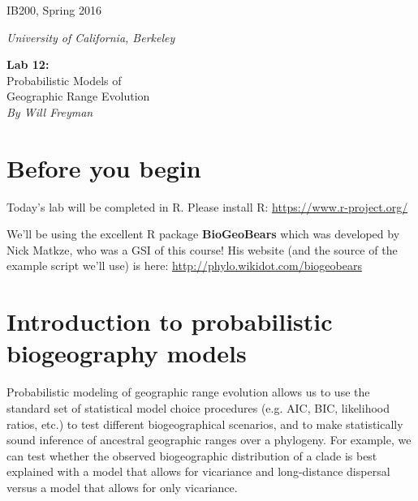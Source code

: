 \documentclass[11pt]{article}
\begin{document}
\noindent
\large
\begin{minipage}{0.5\textwidth}
\begin{flushleft} 
IB200, Spring 2016
\end{flushleft}
\end{minipage}
\begin{minipage}{0.5\textwidth}
\begin{flushright} 
\textit{University of California, Berkeley}
\end{flushright}
\end{minipage}

\vspace{0.5cm}


\begin{center}
\Large \textbf{Lab 12:} \\
Probabilistic Models of \\
Geographic Range Evolution \\
\normalsize
\textit{By Will Freyman} \\
\end{center}

\vspace{0.5cm}

\section{Before you begin}

Today's lab will be completed in R.
Please install R: \url{https://www.r-project.org/}

We'll be using the excellent R package \textbf{BioGeoBears} \citep{matzke2013biogeobears}
which was developed by Nick Matkze, who was a GSI of this course!
His website (and the source of the example script we'll use)
is here:
\url{http://phylo.wikidot.com/biogeobears}

\section{Introduction to probabilistic biogeography models}


Probabilistic modeling of geographic range evolution 
allows us to use the standard set of statistical model choice
procedures (e.g. AIC, BIC, likelihood ratios, etc.)
to test different biogeographical scenarios,
and to make statistically sound inference of ancestral
geographic ranges over a phylogeny.
For example, we can test whether the observed 
biogeographic distribution of a clade is best
explained with a model that allows for 
vicariance and long-distance dispersal versus
a model that allows for only vicariance.
\end{document}
